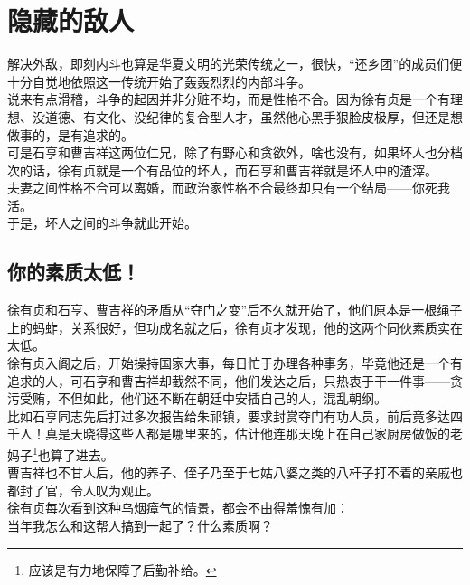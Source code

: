 \section{隐藏的敌人}
\ifnum{}
	\begin{multicols}{\theparacolNo}
\fi
解决外敌，即刻内斗也算是华夏文明的光荣传统之一，很快，“还乡团”的成员们便十分自觉地依照这一传统开始了轰轰烈烈的内部斗争。\\

说来有点滑稽，斗争的起因并非分赃不均，而是性格不合。因为徐有贞是一个有理想、没道德、有文化、没纪律的复合型人才，虽然他心黑手狠脸皮极厚，但还是想做事的，是有追求的。\\

可是石亨和曹吉祥这两位仁兄，除了有野心和贪欲外，啥也没有，如果坏人也分档次的话，徐有贞就是一个有品位的坏人，而石亨和曹吉祥就是坏人中的渣滓。\\

夫妻之间性格不合可以离婚，而政治家性格不合最终却只有一个结局——你死我活。\\

于是，坏人之间的斗争就此开始。\\

\subsection{你的素质太低！}
徐有贞和石亨、曹吉祥的矛盾从“夺门之变”后不久就开始了，他们原本是一根绳子上的蚂蚱，关系很好，但功成名就之后，徐有贞才发现，他的这两个同伙素质实在太低。\\

徐有贞入阁之后，开始操持国家大事，每日忙于办理各种事务，毕竟他还是一个有追求的人，可石亨和曹吉祥却截然不同，他们发达之后，只热衷于干一件事——贪污受贿，不但如此，他们还不断在朝廷中安插自己的人，混乱朝纲。\\

比如石亨同志先后打过多次报告给朱祁镇，要求封赏夺门有功人员，前后竟多达四千人！真是天晓得这些人都是哪里来的，估计他连那天晚上在自己家厨房做饭的老妈子\footnote{应该是有力地保障了后勤补给。}也算了进去。\\

曹吉祥也不甘人后，他的养子、侄子乃至于七姑八婆之类的八杆子打不着的亲戚也都封了官，令人叹为观止。\\

徐有贞每次看到这种乌烟瘴气的情景，都会不由得羞愧有加：\\

当年我怎么和这帮人搞到一起了？什么素质啊？\\


\end{multicols}
